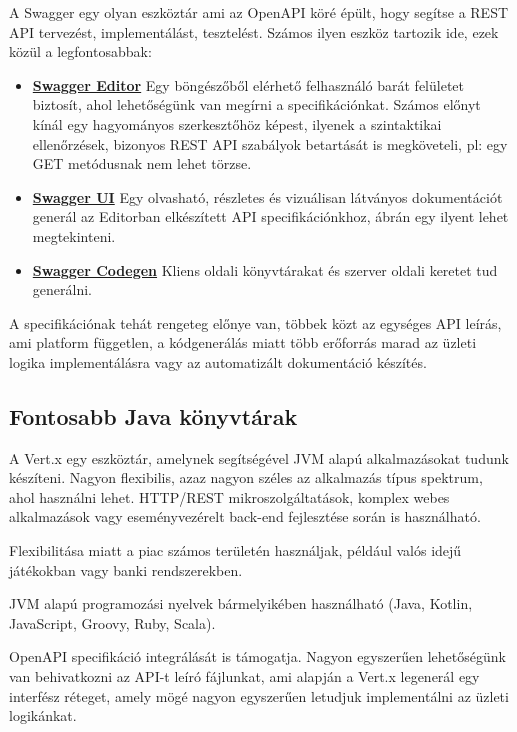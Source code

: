 A Swagger egy olyan eszköztár ami az OpenAPI köré épült, hogy segítse a REST API tervezést, implementálást, tesztelést. Számos ilyen eszköz tartozik ide, ezek közül a legfontosabbak:
\begin{itemize}
	\item \textbf{\href{https://editor.swagger.io/?_ga=2.32011518.1535494714.1606415394-1420243541.1606415394}{Swagger Editor}} Egy böngészőből elérhető felhasználó barát felületet biztosít, ahol lehetőségünk van megírni a specifikációnkat. Számos előnyt kínál egy hagyományos szerkesztőhöz képest, ilyenek a szintaktikai ellenőrzések, bizonyos REST API szabályok betartását is megköveteli, pl: egy GET metódusnak nem lehet törzse.
	\item  \textbf{\href{https://swagger.io/swagger-ui/}{Swagger UI}} Egy olvasható, részletes és vizuálisan látványos dokumentációt generál az Editorban elkészített API specifikációnkhoz,  ábrán egy ilyent lehet megtekinteni.
	\item  \textbf{\href{https://github.com/swagger-api/swagger-codegen}{Swagger Codegen}} Kliens oldali könyvtárakat és szerver oldali keretet tud generálni.
\end{itemize}

A specifikációnak tehát rengeteg előnye van, többek közt az egységes API leírás, ami platform független, a kódgenerálás miatt több erőforrás marad az üzleti logika implementálásra vagy  az automatizált dokumentáció készítés.
\subsection{Fontosabb Java könyvtárak}
A Vert.x egy eszköztár, amelynek segítségével JVM alapú alkalmazásokat tudunk készíteni. Nagyon flexibilis, azaz nagyon széles az alkalmazás típus spektrum, ahol használni lehet. HTTP/REST mikroszolgáltatások, komplex webes alkalmazások vagy eseményvezérelt back-end fejlesztése során is használható.

Flexibilitása miatt a piac számos területén használjak, például valós idejű játékokban vagy banki rendszerekben.

JVM alapú programozási nyelvek bármelyikében használható (Java, Kotlin, JavaScript, Groovy, Ruby, Scala).

OpenAPI specifikáció integrálását is támogatja. Nagyon egyszerűen lehetőségünk van behivatkozni az API-t leíró fájlunkat, ami alapján a Vert.x legenerál egy interfész réteget, amely mögé nagyon egyszerűen letudjuk implementálni az üzleti logikánkat.
